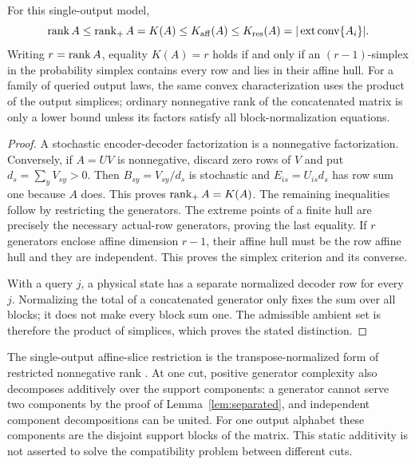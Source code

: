 \begin{proposition}\label{prop:ranks}
For this single-output model,
\begin{equation}\label{eq:ranks}
 \operatorname{rank} A\le\operatorname{rank}_+A=K(A)\le K_{\rm aff}(A)
 \le K_{\rm res}(A)=|\operatorname{ext}\operatorname{conv}\{A_i\}|.
\end{equation}
Writing $r=\operatorname{rank} A$, equality $K(A)=r$ holds if and only if an
$(r-1)$-simplex in the probability simplex contains every row and lies
in their affine hull. For a family of queried output laws, the same
convex characterization uses the product of the output simplices;
ordinary nonnegative rank of the concatenated matrix is only a lower
bound unless its factors satisfy all block-normalization equations.
\end{proposition}
\begin{proof}
A stochastic encoder-decoder factorization is a nonnegative factorization.
Conversely, if $A=UV$ is nonnegative, discard zero rows of $V$ and put
$d_s=\sum_yV_{sy}>0$. Then $B_{sy}=V_{sy}/d_s$ is stochastic and
$E_{is}=U_{is}d_s$ has row sum one because $A$ does. This proves
$\operatorname{rank}_+A=K(A)$. The remaining inequalities follow by restricting the
generators. The extreme points of a finite hull are precisely the
necessary actual-row generators, proving the last equality. If $r$
generators enclose affine dimension $r-1$, their affine hull must be
the row affine hull and they are independent. This proves the simplex
criterion and its converse.

With a query $j$, a physical state has a separate normalized decoder
row for every $j$. Normalizing the total of a concatenated generator
only fixes the sum over all blocks; it does not make every block sum
one. The admissible ambient set is therefore the product of simplices,
which proves the stated distinction.
\end{proof}
The single-output affine-slice restriction is the transpose-normalized
form of restricted nonnegative rank \cite{GG}. At one cut, positive
generator complexity also decomposes additively over the support
components: a generator cannot serve two components by the proof of
Lemma~\ref{lem:separated}, and independent component decompositions can
be united. For one output alphabet these components are the disjoint
support blocks of the matrix. This static additivity is not asserted to
solve the compatibility problem between different cuts.

